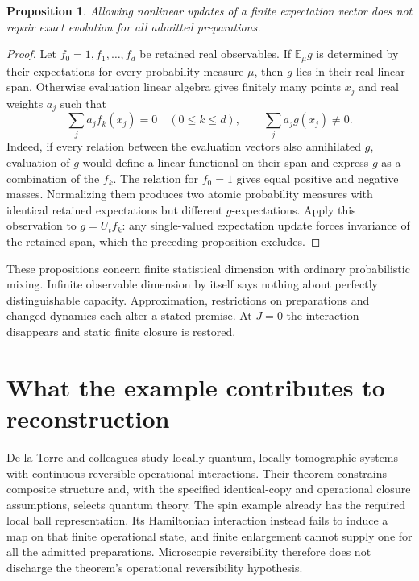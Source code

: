 \documentclass[11pt,a4paper]{article}
\newtheorem{proposition}{Proposition}
\newcommand{\E}{\mathbb E}
\begin{document}
\begin{proposition}
Allowing nonlinear updates of a finite expectation vector does not repair
exact evolution for all admitted preparations.
\end{proposition}
\begin{proof}
Let $f_0=1,f_1,\ldots,f_d$ be retained real observables. If $\E_\mu g$ is
determined by their expectations for every probability measure $\mu$, then
$g$ lies in their real linear span. Otherwise evaluation linear algebra gives
finitely many points $x_j$ and real weights $a_j$ such that
\begin{equation}
 \sum_j a_j f_k(x_j)=0\quad(0\le k\le d),\qquad
 \sum_j a_jg(x_j)\ne0.
\end{equation}
Indeed, if every relation between the evaluation vectors also annihilated
$g$, evaluation of $g$ would define a linear functional on their span and
express $g$ as a combination of the $f_k$. The relation for $f_0=1$ gives
equal positive and negative masses. Normalizing them produces two atomic
probability measures with identical retained expectations but different
$g$-expectations. Apply this observation to $g=U_tf_k$: any single-valued
expectation update forces invariance of the retained span, which the preceding
proposition excludes.
\end{proof}

These propositions concern finite statistical dimension with ordinary
probabilistic mixing. Infinite observable dimension by itself says nothing
about perfectly distinguishable capacity. Approximation, restrictions on
preparations and changed dynamics each alter a stated premise. At $J=0$
the interaction disappears and static finite closure is restored.

\section{What the example contributes to reconstruction}
De la Torre and colleagues \cite{torre} study locally quantum, locally
tomographic systems with continuous reversible operational interactions.
Their theorem constrains composite structure and, with the specified
identical-copy and operational closure assumptions, selects quantum theory.
The spin example already has the required local ball representation. Its
Hamiltonian interaction instead fails to induce a map on that finite
operational state, and finite enlargement cannot supply one for all the
admitted preparations. Microscopic reversibility therefore does not discharge
the theorem's operational reversibility hypothesis.
\end{document}

